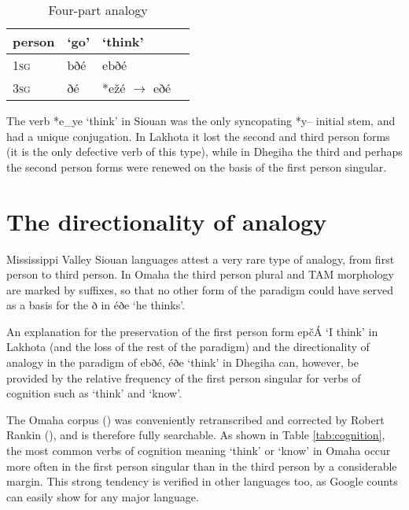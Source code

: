 \documentclass[oneside,a4paper,11pt]{article}
\newcommand{\ipa}[1]{{\phon#1}} %
\begin{document}
 \begin{table}[h]
\caption{Four-part analogy}  \label{tab:four} \centering
\begin{tabular}{l|l|ll}
\toprule
person & `go' & `think' \\
 \midrule
\textsc{1sg} &\ipa{bðé} & \ipa{ebðé} \\
\textsc{3sg}&\ipa{ðé} & *\ipa{ežé} $\rightarrow$ \ipa{eðé} \\
\bottomrule			
\end{tabular}
\end{table} 


The verb *\ipa{e\_ye} `think' in Siouan was the only syncopating *\ipa{y--} initial stem, and had a unique conjugation. In Lakhota it lost the second and third person forms (it is the only defective verb of this type), while in Dhegiha the third and perhaps the second person forms were renewed on the basis of the first person singular.


\section{The directionality of analogy} \label{sec:directionality}

Mississippi Valley Siouan languages attest  a very rare type of analogy, from first person to third person. In Omaha the third person plural  and TAM morphology are marked by suffixes, so that no other form of the paradigm could have served as a basis for the \ipa{ð} in \ipa{éðe} `he thinks'.

An explanation for the preservation of the first person form \ipa{epčÁ} `I think' in Lakhota (and the loss of the rest of the paradigm) and the directionality of analogy in the paradigm of \ipa{ebðé}, \ipa{éðe} `think' in Dhegiha can, however, be provided by the relative frequency of the first person singular for verbs of cognition such as   `think' and `know'.

The Omaha corpus (\citealt{dorsey1890cegiha}) was conveniently retranscribed and corrected by Robert Rankin (\citealt{rankin08dhegiha}), and is therefore fully searchable. As shown in Table \ref{tab:cognition}, the most common  verbs of cognition meaning `think' or `know' in Omaha occur more often in the first person singular than in the third person by a considerable margin. This strong tendency is verified in other languages too, as Google counts can easily show for any major language.%
\end{document}
